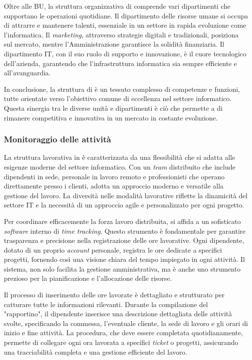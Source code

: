  \noindent Oltre alle BU, la struttura organizzativa di \azienda{} comprende vari dipartimenti che supportano le operazioni quotidiane. 
 Il dipartimento delle risorse umane si occupa di attrarre e mantenere talenti, essenziale in un settore in rapida evoluzione come l'informatica. 
 Il \textit{marketing}, attraverso strategie digitali e tradizionali, posiziona \azienda{} sul mercato, mentre l'Amministrazione garantisce la solidità finanziaria. 
 Il dipartimento \gls{IT}, con il suo ruolo di supporto e innovazione, è il cuore tecnologico dell'azienda, garantendo che l'infrastruttura informatica sia sempre efficiente e all'avanguardia.
 
 \noindent In conclusione, la struttura di \azienda{} è un tessuto complesso di competenze e funzioni, tutte orientate verso l'obiettivo comune di eccellenza nel settore informatico. 
 Questa sinergia tra le diverse unità e dipartimenti è ciò che permette a \azienda{} di rimanere competitiva e innovativa in un mercato in costante evoluzione.
 
\subsubsection*{Monitoraggio delle attività}
\noindent La struttura lavorativa in \azienda{} è caratterizzata da una flessibilità che si adatta alle esigenze moderne del settore informatico. 
Con un \textit{team} distribuito che include dipendenti in sede, personale in lavoro remoto e professionisti che operano direttamente presso i clienti, 
\azienda{} adotta un approccio moderno e versatile alla gestione del lavoro. 
La diversità nelle modalità lavorative riflette la dinamicità del settore IT e la necessità di un approccio agile e personalizzato per 
ogni progetto.

\noindent Per coordinare efficacemente la forza lavoro distribuita, \azienda{} si affida a un sofisticato \textit{software} interno di 
\textit{time tracking}. Questo strumento è fondamentale per garantire trasparenza e precisione nella registrazione delle ore lavorative. 
Ogni dipendente, dotato di un proprio \textit{account} personale, registra le ore dedicate a specifici progetti, 
fornendo così una visione chiara del tempo impiegato in ogni attività. Il sistema, non solo facilita la gestione amministrativa, 
ma è anche uno strumento prezioso per la pianificazione e l'allocazione delle risorse.

\noindent Il processo di inserimento delle ore lavorate è dettagliato e strutturato per catturare tutte le informazioni rilevanti. 
Durante la compilazione del "rapportino", il dipendente inserisce una descrizione dettagliata delle attività svolte, specificando la commessa, 
l'eventuale cliente, la sede di lavoro e gli orari di inizio e fine attività. La procedura, che deve essere completata quotidianamente, 
permette di collegare ogni ora lavorata a specifici \textit{ticket} o progetti, assicurando una tracciabilità completa e una gestione efficiente del lavoro.

